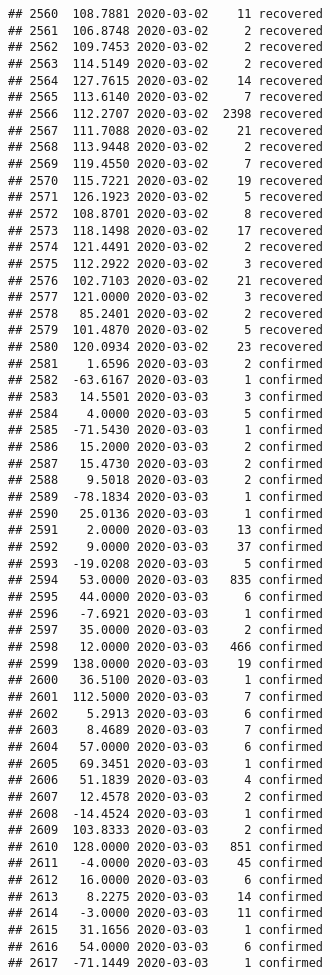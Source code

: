 \documentclass[
]{article}
\begin{document}
\begin{verbatim}
## 2560  108.7881 2020-03-02    11 recovered
## 2561  106.8748 2020-03-02     2 recovered
## 2562  109.7453 2020-03-02     2 recovered
## 2563  114.5149 2020-03-02     2 recovered
## 2564  127.7615 2020-03-02    14 recovered
## 2565  113.6140 2020-03-02     7 recovered
## 2566  112.2707 2020-03-02  2398 recovered
## 2567  111.7088 2020-03-02    21 recovered
## 2568  113.9448 2020-03-02     2 recovered
## 2569  119.4550 2020-03-02     7 recovered
## 2570  115.7221 2020-03-02    19 recovered
## 2571  126.1923 2020-03-02     5 recovered
## 2572  108.8701 2020-03-02     8 recovered
## 2573  118.1498 2020-03-02    17 recovered
## 2574  121.4491 2020-03-02     2 recovered
## 2575  112.2922 2020-03-02     3 recovered
## 2576  102.7103 2020-03-02    21 recovered
## 2577  121.0000 2020-03-02     3 recovered
## 2578   85.2401 2020-03-02     2 recovered
## 2579  101.4870 2020-03-02     5 recovered
## 2580  120.0934 2020-03-02    23 recovered
## 2581    1.6596 2020-03-03     2 confirmed
## 2582  -63.6167 2020-03-03     1 confirmed
## 2583   14.5501 2020-03-03     3 confirmed
## 2584    4.0000 2020-03-03     5 confirmed
## 2585  -71.5430 2020-03-03     1 confirmed
## 2586   15.2000 2020-03-03     2 confirmed
## 2587   15.4730 2020-03-03     2 confirmed
## 2588    9.5018 2020-03-03     2 confirmed
## 2589  -78.1834 2020-03-03     1 confirmed
## 2590   25.0136 2020-03-03     1 confirmed
## 2591    2.0000 2020-03-03    13 confirmed
## 2592    9.0000 2020-03-03    37 confirmed
## 2593  -19.0208 2020-03-03     5 confirmed
## 2594   53.0000 2020-03-03   835 confirmed
## 2595   44.0000 2020-03-03     6 confirmed
## 2596   -7.6921 2020-03-03     1 confirmed
## 2597   35.0000 2020-03-03     2 confirmed
## 2598   12.0000 2020-03-03   466 confirmed
## 2599  138.0000 2020-03-03    19 confirmed
## 2600   36.5100 2020-03-03     1 confirmed
## 2601  112.5000 2020-03-03     7 confirmed
## 2602    5.2913 2020-03-03     6 confirmed
## 2603    8.4689 2020-03-03     7 confirmed
## 2604   57.0000 2020-03-03     6 confirmed
## 2605   69.3451 2020-03-03     1 confirmed
## 2606   51.1839 2020-03-03     4 confirmed
## 2607   12.4578 2020-03-03     2 confirmed
## 2608  -14.4524 2020-03-03     1 confirmed
## 2609  103.8333 2020-03-03     2 confirmed
## 2610  128.0000 2020-03-03   851 confirmed
## 2611   -4.0000 2020-03-03    45 confirmed
## 2612   16.0000 2020-03-03     6 confirmed
## 2613    8.2275 2020-03-03    14 confirmed
## 2614   -3.0000 2020-03-03    11 confirmed
## 2615   31.1656 2020-03-03     1 confirmed
## 2616   54.0000 2020-03-03     6 confirmed
## 2617  -71.1449 2020-03-03     1 confirmed

\end{verbatim}
\end{document}
